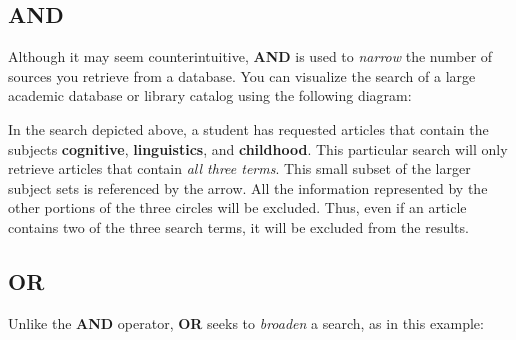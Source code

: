 \subsection{AND}

Although it may seem counterintuitive, \textbf{AND} is used to \emph{narrow}
the number of sources you retrieve from a database. You can visualize  the
search of a large academic database or library catalog using the following
diagram:
\begin{center}

\end{center}

\noindent In the search depicted above, a student has requested articles that
contain the  subjects \textbf{cognitive}, \textbf{linguistics}, and
\textbf{childhood}.  This particular search will only retrieve articles that
contain  \emph{all three terms}. This small subset of the larger subject sets is
referenced by the arrow. All the information represented by the other portions
of the three circles will be excluded. Thus, even if an article contains two of
the three search terms, it will be excluded from the results.

\subsection{OR} Unlike the \textbf{AND} operator, \textbf{OR} seeks to
\emph{broaden} a search,  as in this example:
\bigskip

